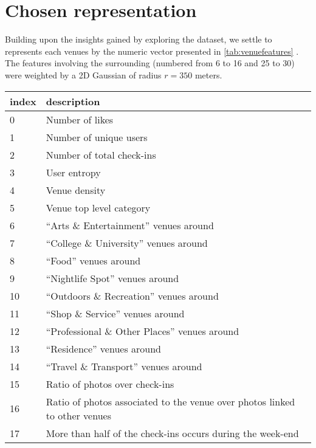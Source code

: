 \section{Chosen representation}
\label{sec:feature}

Building upon the insights gained by exploring the dataset, we settle to
represents each venues by the numeric vector presented in
\autoref{tab:venuefeatures} . The features involving the surrounding (numbered
from 6 to 16 and 25 to 30) were weighted by a 2D Gaussian of radius $r=350$
meters.

\begin{table}[hb]
	\small
    \centering
    \begin{tabularx}{\textwidth}{lX}
        \toprule
        index & description \\
        \midrule
	\datasetRow{}0 & Number of likes \\
	\datasetRow{}1 & Number of unique users \\
	\datasetRow{}2 & Number of total check-ins \\
        3 & User entropy \\
        4 & Venue density \\
	\datasetRow{}5 & Venue top level category \\
        6 & \enquote{Arts \& Entertainment} venues around \\
        7 & \enquote{College \& University} venues around \\
        8 & \enquote{Food} venues around \\
        9 & \enquote{Nightlife Spot} venues around \\
        10 & \enquote{Outdoors \& Recreation} venues around \\
        11 & \enquote{Shop \& Service} venues around \\
        12 & \enquote{Professional \& Other Places} venues around \\
        13 & \enquote{Residence} venues around \\
        14 & \enquote{Travel \& Transport} venues around \\
	15 & Ratio of photos over check-ins \\
	16 & Ratio of photos associated to the venue over photos linked to other venues \\
	17 & More than half of the check-ins occurs during the week-end \\

\end{tabularx}
\end{table}
